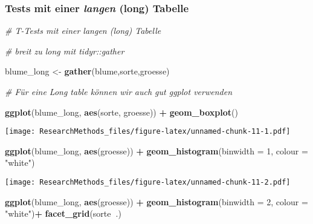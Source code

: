\documentclass[]{book}
\newenvironment{Shaded}{\begin{snugshade}}{\end{snugshade}}
\newcommand{\KeywordTok}[1]{\textcolor[rgb]{0.13,0.29,0.53}{\textbf{#1}}}
\newcommand{\DataTypeTok}[1]{\textcolor[rgb]{0.13,0.29,0.53}{#1}}
\newcommand{\DecValTok}[1]{\textcolor[rgb]{0.00,0.00,0.81}{#1}}
\newcommand{\StringTok}[1]{\textcolor[rgb]{0.31,0.60,0.02}{#1}}
\newcommand{\CommentTok}[1]{\textcolor[rgb]{0.56,0.35,0.01}{\textit{#1}}}
\newcommand{\OperatorTok}[1]{\textcolor[rgb]{0.81,0.36,0.00}{\textbf{#1}}}
\newcommand{\NormalTok}[1]{#1}
\begin{document}
\subsubsection{\texorpdfstring{Tests mit einer \emph{langen} (long)
Tabelle}{Tests mit einer langen (long) Tabelle}}\label{tests-mit-einer-langen-long-tabelle}

\begin{Shaded}
\begin{Highlighting}[]
\CommentTok{# T-Tests mit einer langen (long) Tabelle}

\CommentTok{# breit zu long mit tidyr::gather}

\NormalTok{blume_long <-}\StringTok{ }\KeywordTok{gather}\NormalTok{(blume,sorte,groesse)}

\CommentTok{# Für eine Long table können wir auch gut ggplot verwenden}

\KeywordTok{ggplot}\NormalTok{(blume_long, }\KeywordTok{aes}\NormalTok{(sorte, groesse)) }\OperatorTok{+}
\StringTok{  }\KeywordTok{geom_boxplot}\NormalTok{()}
\end{Highlighting}
\end{Shaded}

\texttt{[image: ResearchMethods\_files/figure-latex/unnamed-chunk-11-1.pdf]}

\begin{Shaded}
\begin{Highlighting}[]

\KeywordTok{ggplot}\NormalTok{(blume_long, }\KeywordTok{aes}\NormalTok{(groesse)) }\OperatorTok{+}
\StringTok{  }\KeywordTok{geom_histogram}\NormalTok{(}\DataTypeTok{binwidth =} \DecValTok{1}\NormalTok{, }\DataTypeTok{colour =} \StringTok{"white"}\NormalTok{)}
\end{Highlighting}
\end{Shaded}

\texttt{[image: ResearchMethods\_files/figure-latex/unnamed-chunk-11-2.pdf]}

\begin{Shaded}
\begin{Highlighting}[]

\KeywordTok{ggplot}\NormalTok{(blume_long, }\KeywordTok{aes}\NormalTok{(groesse)) }\OperatorTok{+}
\StringTok{  }\KeywordTok{geom_histogram}\NormalTok{(}\DataTypeTok{binwidth =} \DecValTok{2}\NormalTok{, }\DataTypeTok{colour =} \StringTok{"white"}\NormalTok{)}\OperatorTok{+}
\StringTok{  }\KeywordTok{facet_grid}\NormalTok{(sorte}\OperatorTok{~}\NormalTok{.)}
\end{Highlighting}
\end{Shaded}
\end{document}
